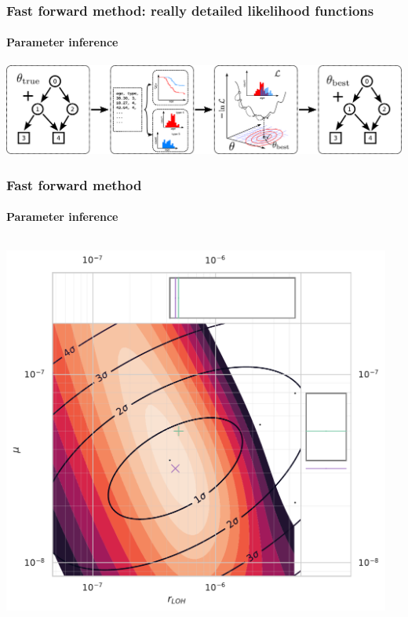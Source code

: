 \documentclass{beamer}
\begin{document}
\begin{frame}
    \frametitle{Fast forward method: really detailed likelihood functions}
    \framesubtitle{Parameter inference}
    \includegraphics[width=\textwidth]{figures/flowchart.pdf}
\end{frame}

\begin{frame}
    \frametitle{Fast forward method}
    \framesubtitle{Parameter inference}
    \begin{columns}
        \begin{column}{0.5\textwidth}
        \includegraphics[width=\textwidth]{figures/scatterplot_floating_mutrates_fixed_32}
        \end{column}
        \begin{column}{0.5\textwidth}

\end{column}
\end{columns}
\end{frame}
\end{document}
